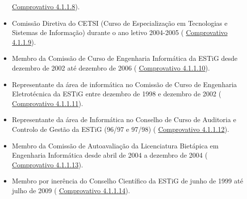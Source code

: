 \documentclass[11pt]{article}
\begin{document}
\begin{itemize}
{\href{run:MissaoIPBCargos/AssembleiaRepresentantes.pdf}{Comprovativo 4.1.1.8}).}
\item{Comissão Diretiva do CETSI (Curso de Especialização em Tecnologias e Sistemas de Informação) durante o ano letivo 2004-2005 (
\href{run:MissaoIPBCargos/avaliacaoReestruturacao.pdf}{Comprovativo 4.1.1.9}).}
\item{Membro da Comissão de Curso de Engenharia Informática da ESTiG desde dezembro de 2002 até dezembro de 2006 (
\href{run:MissaoIPBCargos/CP.pdf}{Comprovativo 4.1.1.10}).}
\item{Representante da área de informática no Comissão de Curso de Engenharia Eletrotécnica da ESTiG entre dezembro de 1998 e dezembro de 2002 (
\href{run:MissaoIPBCargos/CP.pdf}{Comprovativo 4.1.1.11}).}
\item{Representante da área de Informática no Conselho de Curso de Auditoria e Controlo de Gestão da ESTiG (96/97 e 97/98) (
\href{run:MissaoIPBCargos/InfACG.pdf}{Comprovativo 4.1.1.12}).}
\item{Membro da Comissão de Autoavaliação da Licenciatura Bietápica em Engenharia Informática desde abril de 2004 a dezembro de 2004 (
\href{run:MissaoIPBCargos/CALEI.pdf}{Comprovativo 4.1.1.13}).}
\item{Membro por inerência do Conselho Científico da ESTiG de junho de 1999 até julho de 2009 (
\href{run:MissaoIPBCargos/ConselhoCientifico.pdf}{Comprovativo 4.1.1.14}). }
\end{itemize}
\end{document}
